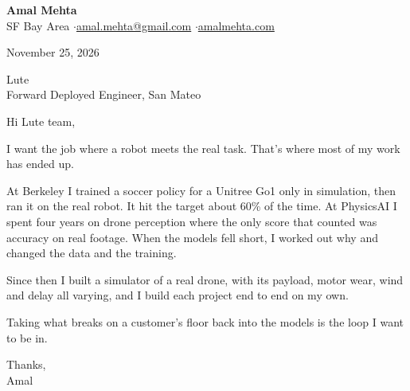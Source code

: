 \documentclass[11pt]{article}
\begin{document}
{\LARGE\bfseries Amal Mehta}\\[3pt]
SF Bay Area \quad$\cdot$\quad \href{mailto:amal.mehta@gmail.com}{amal.mehta@gmail.com} \quad$\cdot$\quad \href{https://amalmehta.com/}{amalmehta.com}

\vspace{1.2em}
November 25, 2026

Lute\\
Forward Deployed Engineer, San Mateo

\vspace{0.4em}
Hi Lute team,

I want the job where a robot meets the real task. That’s where most of my work has ended up.

At Berkeley I trained a soccer policy for a Unitree Go1 only in simulation, then ran it on the real robot. It hit the target about 60\% of the time. At PhysicsAI I spent four years on drone perception where the only score that counted was accuracy on real footage. When the models fell short, I worked out why and changed the data and the training.

Since then I built a simulator of a real drone, with its payload, motor wear, wind and delay all varying, and I build each project end to end on my own.

Taking what breaks on a customer’s floor back into the models is the loop I want to be in.

Thanks,\\
Amal
\end{document}
